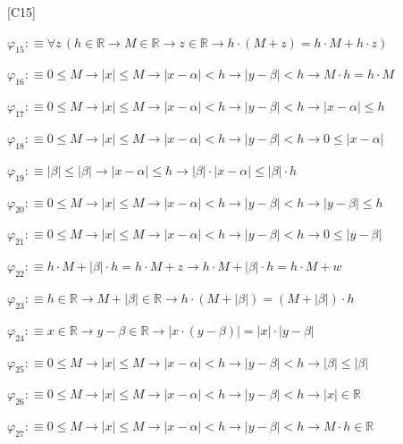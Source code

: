 \begin{fullproof}{[C15]}
\begin{abbrevlist}
\item $\varphi_{15} :\equiv \forall z\,(h \in \mathbb{R} \to M \in \mathbb{R} \to z \in \mathbb{R} \to h \cdot (M + z) = h \cdot M + h \cdot z)$
\item $\varphi_{16} :\equiv 0 \leq M \to \lvert x \rvert \leq M \to \lvert x - \alpha \rvert < h \to \lvert y - \beta \rvert < h \to M \cdot h = h \cdot M$
\item $\varphi_{17} :\equiv 0 \leq M \to \lvert x \rvert \leq M \to \lvert x - \alpha \rvert < h \to \lvert y - \beta \rvert < h \to \lvert x - \alpha \rvert \leq h$
\item $\varphi_{18} :\equiv 0 \leq M \to \lvert x \rvert \leq M \to \lvert x - \alpha \rvert < h \to \lvert y - \beta \rvert < h \to 0 \leq \lvert x - \alpha \rvert$
\item $\varphi_{19} :\equiv \lvert \beta \rvert \leq \lvert \beta \rvert \to \lvert x - \alpha \rvert \leq h \to \lvert \beta \rvert \cdot \lvert x - \alpha \rvert \leq \lvert \beta \rvert \cdot h$
\item $\varphi_{20} :\equiv 0 \leq M \to \lvert x \rvert \leq M \to \lvert x - \alpha \rvert < h \to \lvert y - \beta \rvert < h \to \lvert y - \beta \rvert \leq h$
\item $\varphi_{21} :\equiv 0 \leq M \to \lvert x \rvert \leq M \to \lvert x - \alpha \rvert < h \to \lvert y - \beta \rvert < h \to 0 \leq \lvert y - \beta \rvert$
\item $\varphi_{22} :\equiv h \cdot M + \lvert \beta \rvert \cdot h = h \cdot M + z \to h \cdot M + \lvert \beta \rvert \cdot h = h \cdot M + w$
\item $\varphi_{23} :\equiv h \in \mathbb{R} \to M + \lvert \beta \rvert \in \mathbb{R} \to h \cdot (M + \lvert \beta \rvert) = (M + \lvert \beta \rvert) \cdot h$
\item $\varphi_{24} :\equiv x \in \mathbb{R} \to y - \beta \in \mathbb{R} \to \lvert x \cdot (y - \beta) \rvert = \lvert x \rvert \cdot \lvert y - \beta \rvert$
\item $\varphi_{25} :\equiv 0 \leq M \to \lvert x \rvert \leq M \to \lvert x - \alpha \rvert < h \to \lvert y - \beta \rvert < h \to \lvert \beta \rvert \leq \lvert \beta \rvert$
\item $\varphi_{26} :\equiv 0 \leq M \to \lvert x \rvert \leq M \to \lvert x - \alpha \rvert < h \to \lvert y - \beta \rvert < h \to \lvert x \rvert \in \mathbb{R}$
\item $\varphi_{27} :\equiv 0 \leq M \to \lvert x \rvert \leq M \to \lvert x - \alpha \rvert < h \to \lvert y - \beta \rvert < h \to M \cdot h \in \mathbb{R}$

\end{abbrevlist}
\end{fullproof}
